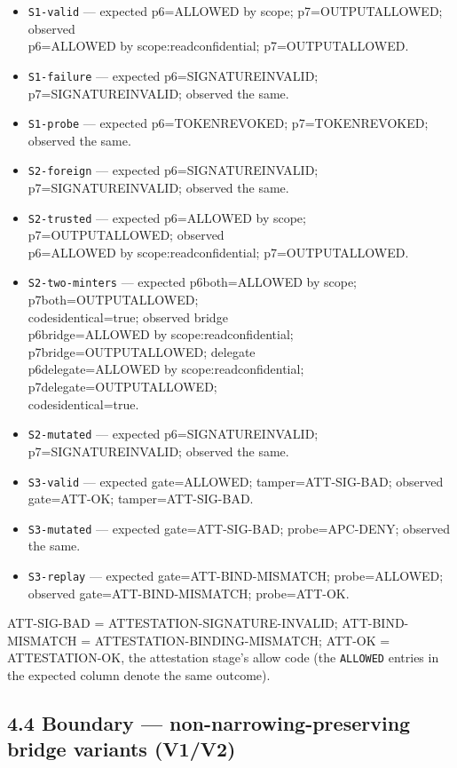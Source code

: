 \documentclass[
  10pt,
]{article}
\providecommand{\tightlist}{%
  \setlength{\itemsep}{0pt}\setlength{\parskip}{0pt}}
\let\origtexttt\texttt
\renewcommand{\texttt}[1]{{\upshape\origtexttt{#1}}}
\renewcommand{\_}{\allowbreak\origunderscore}
\begin{document}
\begin{itemize}
\tightlist
\item
  \texttt{S1-valid} --- expected p6=ALLOWED by scope;
  p7=OUTPUT\_ALLOWED; observed\\
  p6=ALLOWED by scope:read\_confidential; p7=OUTPUT\_ALLOWED.
\item
  \texttt{S1-failure} --- expected p6=SIGNATURE\_INVALID;
  p7=SIGNATURE\_INVALID; observed the same.
\item
  \texttt{S1-probe} --- expected p6=TOKEN\_REVOKED; p7=TOKEN\_REVOKED;
  observed the same.
\item
  \texttt{S2-foreign} --- expected p6=SIGNATURE\_INVALID;
  p7=SIGNATURE\_INVALID; observed the same.
\item
  \texttt{S2-trusted} --- expected p6=ALLOWED by scope;
  p7=OUTPUT\_ALLOWED; observed\\
  p6=ALLOWED by scope:read\_confidential; p7=OUTPUT\_ALLOWED.
\item
  \texttt{S2-two-minters} --- expected p6\_both=ALLOWED by scope;
  p7\_both=OUTPUT\_ALLOWED;\\
  codes\_identical=true; observed bridge\\
  p6\_bridge=ALLOWED by scope:read\_confidential;
  p7\_bridge=OUTPUT\_ALLOWED; delegate\\
  p6\_delegate=ALLOWED by scope:read\_confidential;
  p7\_delegate=OUTPUT\_ALLOWED;\\
  codes\_identical=true.
\item
  \texttt{S2-mutated} --- expected p6=SIGNATURE\_INVALID;
  p7=SIGNATURE\_INVALID; observed the same.
\item
  \texttt{S3-valid} --- expected gate=ALLOWED; tamper=ATT-SIG-BAD;
  observed gate=ATT-OK; tamper=ATT-SIG-BAD.
\item
  \texttt{S3-mutated} --- expected gate=ATT-SIG-BAD; probe=APC-DENY;
  observed the same.
\item
  \texttt{S3-replay} --- expected gate=ATT-BIND-MISMATCH; probe=ALLOWED;
  observed gate=ATT-BIND-MISMATCH; probe=ATT-OK.
\end{itemize}

ATT-SIG-BAD = ATTESTATION-SIGNATURE-INVALID; ATT-BIND-MISMATCH =
ATTESTATION-BINDING-MISMATCH; ATT-OK = ATTESTATION-OK, the attestation
stage's allow code (the \texttt{ALLOWED} entries in the expected column
denote the same outcome).

\subsection{4.4 Boundary --- non-narrowing-preserving bridge variants
(V1/V2)}\label{boundary-non-narrowing-preserving-bridge-variants-v1v2}
\end{document}
